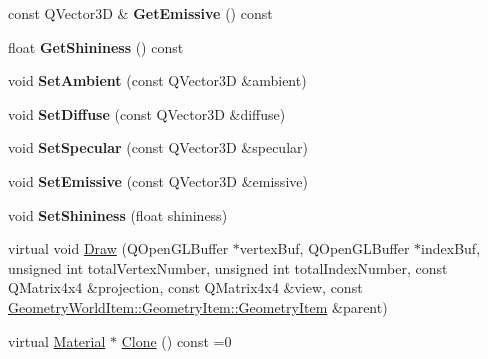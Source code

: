 \begin{DoxyCompactItemize}
const Q\+Vector3D \& {\bfseries Get\+Emissive} () const
\item 
\mbox{\label{class_geometry_engine_1_1_geometry_material_1_1_material_a517bf55d5113251b7e8988763a75f410}} 
float {\bfseries Get\+Shininess} () const
\item 
\mbox{\label{class_geometry_engine_1_1_geometry_material_1_1_material_ab3ccb917f001a72ea1ec89f172bf6ea2}} 
void {\bfseries Set\+Ambient} (const Q\+Vector3D \&ambient)
\item 
\mbox{\label{class_geometry_engine_1_1_geometry_material_1_1_material_aac88cfef061887999b06c1c26bfaa55e}} 
void {\bfseries Set\+Diffuse} (const Q\+Vector3D \&diffuse)
\item 
\mbox{\label{class_geometry_engine_1_1_geometry_material_1_1_material_a94d9c789909849bfcb007fabbfb4a589}} 
void {\bfseries Set\+Specular} (const Q\+Vector3D \&specular)
\item 
\mbox{\label{class_geometry_engine_1_1_geometry_material_1_1_material_adf53020aa72682ba01834105f7129b93}} 
void {\bfseries Set\+Emissive} (const Q\+Vector3D \&emissive)
\item 
\mbox{\label{class_geometry_engine_1_1_geometry_material_1_1_material_a2b3269750da169f6228f78beac202bac}} 
void {\bfseries Set\+Shininess} (float shininess)
\item 
virtual void \mbox{\hyperlink{class_geometry_engine_1_1_geometry_material_1_1_material_ae337c74e4f500d0a881779c2c3495908}{Draw}} (Q\+Open\+G\+L\+Buffer $\ast$vertex\+Buf, Q\+Open\+G\+L\+Buffer $\ast$index\+Buf, unsigned int total\+Vertex\+Number, unsigned int total\+Index\+Number, const Q\+Matrix4x4 \&projection, const Q\+Matrix4x4 \&view, const \mbox{\hyperlink{class_geometry_engine_1_1_geometry_world_item_1_1_geometry_item_1_1_geometry_item}{Geometry\+World\+Item\+::\+Geometry\+Item\+::\+Geometry\+Item}} \&parent)
\item 
virtual \mbox{\hyperlink{class_geometry_engine_1_1_geometry_material_1_1_material}{Material}} $\ast$ \mbox{\hyperlink{class_geometry_engine_1_1_geometry_material_1_1_material_ae5513ff06d536365e18ddc5e07e79784}{Clone}} () const =0
\end{DoxyCompactItemize}
